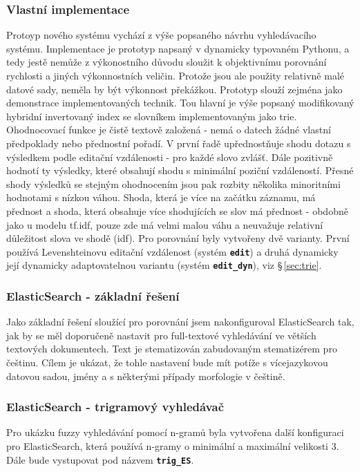 \documentclass[11pt,letterpaper,oneside,openright]{book}
\newcommand{\bftt}[1]{\texttt{\textbf{#1}}}
\begin{document}
\subsubsection{Vlastní implementace}
Protoyp nového systému vychází z výše popsaného návrhu vyhledávacího systému.
Implementace je prototyp napsaný v dynamicky typovaném Pythonu, a tedy jestě
nemůže z výkonostního důvodu sloužit k objektivnímu porovnání rychlosti a
jiných výkonnostních veličin. Protože jsou ale použity relativně malé datové
sady, neměla by být výkonnost překážkou. Prototyp slouží zejména jako
demonstrace implementovaných technik. Tou hlavní je výše popsaný modifikovaný
hybridní invertovaný index se slovníkem implementovaným jako trie. Ohodnocovací
funkce je čistě textově založená - nemá o datech žádné vlastní předpoklady nebo
přednostní pořadí. V první řadě upřednostňuje shodu dotazu s výsledkem podle
editační vzdálenosti - pro každé slovo zvlášť. Dále pozitivně hodnotí ty
výsledky, které obsahují shodu s minimální poziční vzdáleností. Přesné shody
výsledků se stejným ohodnocením jsou pak rozbity několika minoritními hodnotami
s nízkou váhou. Shoda, která je více na začátku záznamu, má přednost a shoda,
která obsahuje více shodujících se slov má přednost - obdobně jako u modelu
tf.idf, pouze zde má velmi malou váhu a neuvažuje relativní důležitost slova ve
shodě (idf). Pro porovnání byly vytvořeny dvě varianty. První používá
Levenshteinovu editační vzdálenost (systém \bftt{edit}) a druhá dynamicky její
dynamicky adaptovatelnou variantu (systém \bftt{edit\_dyn}), viz
\S\,\ref{sec:trie}.

\subsubsection{ElasticSearch - základní řešení}
Jako základní řešení sloužící pro porovnání jsem nakonfiguroval ElasticSearch
tak, jak by se měl doporučeně nastavit pro full-textové vyhledávání ve větších
textových dokumentech. Text je stematizován zabudovaným stematizérem pro
češtinu. Cílem je ukázat, že tohle nastavení bude mít potíže s vícejazykovou
datovou sadou, jmény a s některými případy morfologie v češtině.

\subsubsection{ElasticSearch - trigramový vyhledávač} \label{sec:trigram_implementation}
Pro ukázku fuzzy vyhledávání pomocí n-gramů byla vytvořena další konfiguraci
pro ElasticSearch, která používá n-gramy o minimální a maximální velikosti 3.
Dále bude vystupovat pod názvem \bftt{trig\_ES}.
\end{document}
